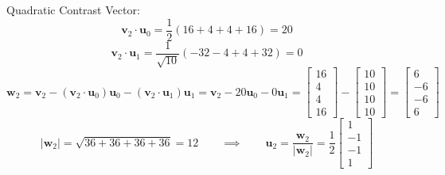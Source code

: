 \documentclass[11pt]{article}
\begin{document}
\begin{enumerate}
Quadratic Contrast Vector:
\begin{equation*}
\mathbf{v}_2\cdot\mathbf{u}_0=\frac{1}{2}(16+4+4+16)=20
\end{equation*}
\begin{equation*}
\mathbf{v}_2\cdot\mathbf{u}_1=\frac{1}{\sqrt{10}}(-32-4+4+32)=0
\end{equation*}
\begin{equation*}
\mathbf{w}_2=\mathbf{v}_2-(\mathbf{v}_2\cdot\mathbf{u}_0)\mathbf{u}_0-(\mathbf{v}_2\cdot\mathbf{u}_1)\mathbf{u}_1
=\mathbf{v}_2-20\mathbf{u}_0-0\mathbf{u}_1
=\begin{bmatrix}16 \\ 4 \\ 4 \\ 16\end{bmatrix}-\begin{bmatrix}10 \\ 10 \\ 10 \\ 10\end{bmatrix}
=\begin{bmatrix}6 \\ -6 \\ -6 \\ 6\end{bmatrix}
\end{equation*}
\begin{equation*}
|\mathbf{w}_2|=\sqrt{36+36+36+36}=12\qquad\implies\qquad
\mathbf{u}_2=\frac{\mathbf{w}_2}{|\mathbf{w}_2|}=\frac{1}{2}\begin{bmatrix}1 \\ -1 \\ -1 \\ 1\end{bmatrix}
\end{equation*}


\end{enumerate}
\end{document}

